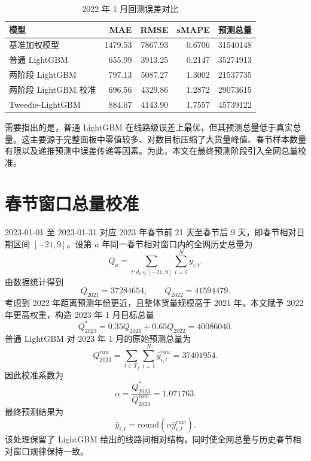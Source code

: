 \documentclass[UTF8,zihao=-4,a4paper,fontset=fandol]{ctexart}
\begin{document}
\begin{table}[H]
  \centering
  \caption{2022 年 1 月回测误差对比}
  \label{tab:model-compare}
  \begin{tabular}{lrrrr}
    \toprule
    模型 & MAE & RMSE & sMAPE & 预测总量 \\
    \midrule
    基准加权模型 & 1479.53 & 7867.93 & 0.6706 & 31540148 \\
    普通 LightGBM & 655.99 & 3913.25 & 0.2147 & 35274913 \\
    两阶段 LightGBM & 797.13 & 5087.27 & 1.3002 & 21537735 \\
    两阶段 LightGBM 校准 & 696.56 & 4329.86 & 1.2872 & 29073615 \\
    Tweedie-LightGBM & 884.67 & 4143.90 & 1.7557 & 45739122 \\
    \bottomrule
  \end{tabular}
\end{table}

需要指出的是，普通 LightGBM 在线路级误差上最优，但其预测总量低于真实总量。这主要源于完整面板中零值较多、对数目标压缩了大货量峰值、春节样本数量有限以及递推预测中误差传递等因素。为此，本文在最终预测阶段引入全网总量校准。

\section{春节窗口总量校准}

2023-01-01 至 2023-01-31 对应 2023 年春节前 21 天至春节后 9 天，即春节相对日期区间 $[-21,9]$。设第 $a$ 年同一春节相对窗口内的全网历史总量为
\begin{equation}
  Q_a=\sum_{t:d_t\in[-21,9]}\sum_{i=1}^{N}y_{i,t}.
  \label{eq:history-window-total}
\end{equation}
由数据统计得到
\[
  Q_{2021}=37284654,\qquad Q_{2022}=41594479.
\]
考虑到 2022 年距离预测年份更近，且整体货量规模高于 2021 年，本文赋予 2022 年更高权重，构造 2023 年 1 月目标总量
\begin{equation}
  Q_{2023}^{*}=0.35Q_{2021}+0.65Q_{2022}=40086040.
  \label{eq:target-total}
\end{equation}
普通 LightGBM 对 2023 年 1 月的原始预测总量为
\begin{equation}
  Q_{2023}^{raw}=\sum_{t\in T_f}\sum_{i=1}^{N}\hat y_{i,t}^{raw}=37401954.
  \label{eq:raw-total}
\end{equation}
因此校准系数为
\begin{equation}
  \alpha=\frac{Q_{2023}^{*}}{Q_{2023}^{raw}}=1.071763.
  \label{eq:alpha}
\end{equation}
最终预测结果为
\begin{equation}
  \hat y_{i,t}=\mathrm{round}(\alpha\hat y_{i,t}^{raw}).
  \label{eq:final-pred}
\end{equation}
该处理保留了 LightGBM 给出的线路间相对结构，同时使全网总量与历史春节相对窗口规律保持一致。
\end{document}
